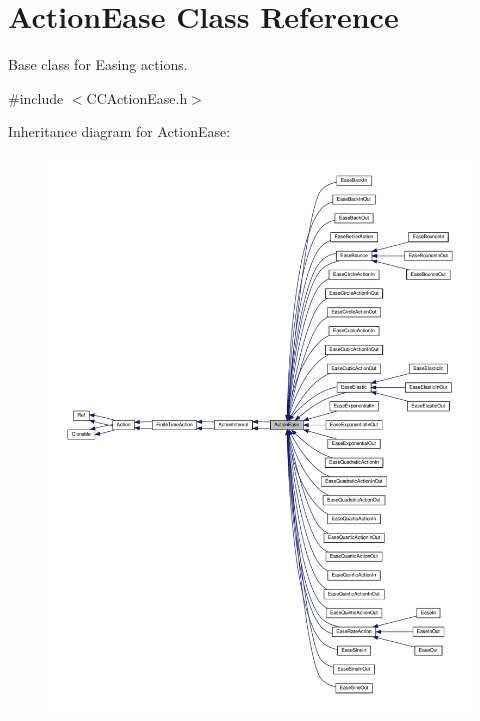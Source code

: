 \hypertarget{classActionEase}{}\section{Action\+Ease Class Reference}
\label{classActionEase}


Base class for Easing actions.  




{\ttfamily \#include $<$C\+C\+Action\+Ease.\+h$>$}



Inheritance diagram for Action\+Ease\+:
\nopagebreak
\begin{figure}[H]
\begin{center}
\leavevmode
\includegraphics[width=350pt]{classActionEase__inherit__graph}
\end{center}
\end{figure}


